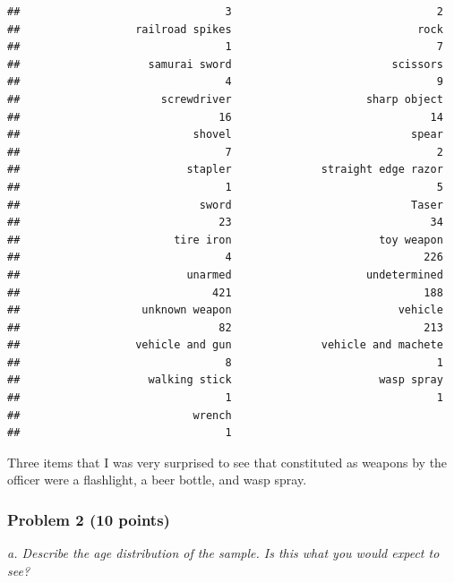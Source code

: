 \documentclass[
]{article}
\newenvironment{Shaded}{\begin{snugshade}}{\end{snugshade}}
\newcommand{\AttributeTok}[1]{\textcolor[rgb]{0.77,0.63,0.00}{#1}}
\newcommand{\FunctionTok}[1]{\textcolor[rgb]{0.00,0.00,0.00}{#1}}
\newcommand{\NormalTok}[1]{#1}
\newcommand{\SpecialCharTok}[1]{\textcolor[rgb]{0.00,0.00,0.00}{#1}}
\newcommand{\StringTok}[1]{\textcolor[rgb]{0.31,0.60,0.02}{#1}}
\begin{document}
\begin{verbatim}
##                                3                                2 
##                  railroad spikes                             rock 
##                                1                                7 
##                    samurai sword                         scissors 
##                                4                                9 
##                      screwdriver                     sharp object 
##                               16                               14 
##                           shovel                            spear 
##                                7                                2 
##                          stapler              straight edge razor 
##                                1                                5 
##                            sword                            Taser 
##                               23                               34 
##                        tire iron                       toy weapon 
##                                4                              226 
##                          unarmed                     undetermined 
##                              421                              188 
##                   unknown weapon                          vehicle 
##                               82                              213 
##                  vehicle and gun              vehicle and machete 
##                                8                                1 
##                    walking stick                       wasp spray 
##                                1                                1 
##                           wrench 
##                                1
\end{verbatim}

Three items that I was very surprised to see that constituted as weapons
by the officer were a flashlight, a beer bottle, and wasp spray.

\hypertarget{problem-2-10-points}{%
\subsubsection{Problem 2 (10 points)}\label{problem-2-10-points}}

\emph{a. Describe the age distribution of the sample. Is this what you
would expect to see?}

\begin{Shaded}
\end{Shaded}
\end{document}
